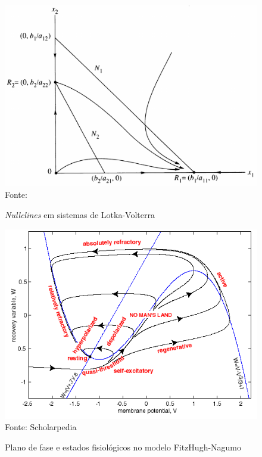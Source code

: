 \begin{figure}[]
	\centering
	\caption{\textit{Nullclines} em sistemas de Lotka-Volterra}
	\label{fig:nullclineslotkavolterra}
	\includegraphics[width=0.7\linewidth]{figs/nullclines_lotka_volterra}\\
	\small{Fonte: \cite{zeeman_extinction_1995}}
\end{figure}

\begin{figure}[]
	\centering
	\caption{Plano de fase e estados fisiológicos no modelo FitzHugh-Nagumo}
	\label{fig:fitzhugh}
	\includegraphics[width=0.7\linewidth]{figs/fitzhugh}\\
	\small{Fonte: Scholarpedia}
\end{figure}

